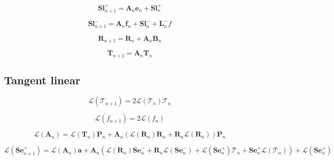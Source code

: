 \begin{equation}
\mathbf{Sl}^{+}_{n+1} = \mathbf{A}_{n}\mathbf{e}_{n} + \mathbf{Sl}^{+}_{n}
\label{eq:doubling-forward-Sl_p}
\end{equation}

\begin{equation}
\mathbf{Sl}^{-}_{n+1} = \mathbf{A}_{n}\mathbf{f}_{n} + \mathbf{Sl}^{-}_{n} + \mathbf{L}^{-}_{n}f
\label{eq:doubling-forward-Sl_m}
\end{equation}

\begin{equation}
\mathbf{R}_{n+1} = \mathbf{R}_{n} + \mathbf{A}_{n}\mathbf{B}_{n}
\label{eq:doubling-forward-R}
\end{equation}

\begin{equation}
\mathbf{T}_{n+1} = \mathbf{A}_{n}\mathbf{T}_{n}
\label{eq:doubling-forward-T}
\end{equation}


%
\subsection{Tangent linear}
\label{sec:doubling-tangent_linear}

\begin{equation}
\mathcal{L}(\mathcal{T}_{n+1}) = 2 \mathcal{L}(\mathcal{T}_{n}) \mathcal{T}_{n}
\label{eq:doubling-tangent_linear-script_T_l_n_p_1}
\end{equation}

\begin{equation}
\mathcal{L}(f_{n+1}) = 2\mathcal{L}(f_{n})
\label{eq:doubling-tangent_linear-f_l_n_p_1}
\end{equation}


\begin{equation}
\mathcal{L}(\mathbf{A}_{n}) = \mathcal{L}(\mathbf{T}_{n})\mathbf{P}_{n} + \mathbf{A}_{n}(\mathcal{L}(\mathbf{R}_{n})\mathbf{R}_{n} + \mathbf{R}_{n}\mathcal{L}(\mathbf{R}_{n}))\mathbf{P}_{n}
\label{eq:doubling-tangent_linear-A_l}
\end{equation}


\begin{equation}
\mathcal{L}(\mathbf{Se}^{+}_{n+1}) = \mathcal{L}(\mathbf{A}_{n})\mathbf{a} + \mathbf{A}_{n}(\mathcal{L}(\mathbf{R}_{n})\mathbf{Se}^{-}_{n} + \mathbf{R}_{n}\mathcal{L}(\mathbf{Se}^{-}_{n}) + \mathcal{L}(\mathbf{Se}^{+}_{n})\mathcal{T}_{n} + \mathbf{Se}^{+}_{n}\mathcal{L}(\mathcal{T}_{n})) + \mathcal{L}(\mathbf{Se}^{+}_{n})
\label{eq:doubling-tangent_linear-Se_p_l}
\end{equation}

